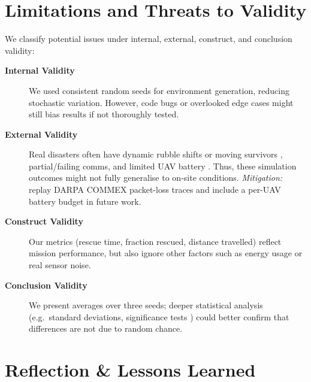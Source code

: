 \documentclass[12pt,a4paper]{report}
\begin{document}
\section{Limitations and Threats to Validity}
We classify potential issues under internal, external, construct, and conclusion validity:

\begin{description}
  \item[\textbf{Internal Validity}] We used consistent random seeds for environment generation,
  reducing stochastic variation.  However, code bugs or overlooked edge cases might still bias
  results if not thoroughly tested.

  \item[\textbf{External Validity}] Real disasters often have dynamic rubble shifts or moving
  survivors \cite{Auclair2021CollapseRisk,Oleynikova2018ReplanDynamic}, partial/failing comms,
  and limited UAV battery \cite{Murphy2014DisasterRobotics}.  Thus, these simulation outcomes
  might not fully generalise to on-site conditions.  
  \textit{Mitigation:} replay DARPA COMMEX packet-loss traces and include a per-UAV battery
  budget in future work.

  \item[\textbf{Construct Validity}] Our metrics (rescue time, fraction rescued, distance travelled)
  reflect mission performance, but also ignore other factors such as energy usage or real sensor noise.

  \item[\textbf{Conclusion Validity}] We present averages over three seeds; deeper statistical
  analysis (e.g.\ standard deviations, significance tests \cite{Montgomery2017DOE}) could better confirm
  that differences are not due to random chance.
\end{description}

\section{Reflection \& Lessons Learned}
\end{document}
